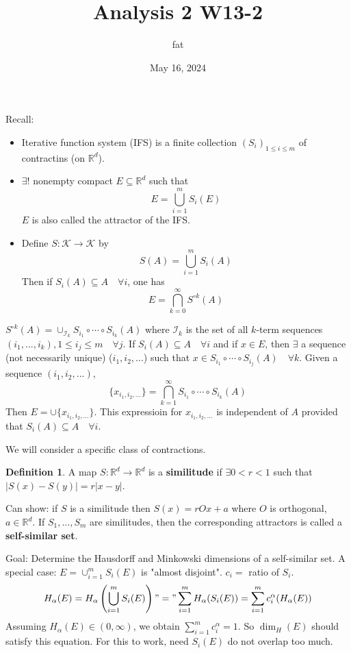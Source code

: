 \documentclass{article}
\title{Analysis 2 W13-2}
\author{fat}
\date{May 16, 2024}
\theoremstyle{definition}
\newtheorem{dfn}{Definition}
\newcommand{\I}{\mathcal I}
\newcommand{\K}{\mathcal K}
\newcommand{\RR}{\mathbb R}
\begin{document}
\maketitle
\thispagestyle{fancy}
\renewcommand{\footrulewidth}{0.4pt}
\cfoot{\thepage}
\renewcommand{\headrulewidth}{0.4pt}

Recall: 
\begin{itemize}
	\item Iterative function system (IFS) is a finite collection $(S_i)_{1 \leq i \leq m}$ of contractins (on $\RR^d$).

	\item $\exists ! $ nonempty compact $E \subseteq \RR^d$ such that
		\[
			E = \bigcup_{i = 1}^m S_i(E)
		\]
		$E$ is also called the attractor of the IFS.

	\item Define $S:\K \to \K$ by 
		\[
			S(A) = \bigcup_{i = 1}^m S_i(A)
		\]
		Then if $S_i(A) \subseteq A \quad \forall i$, one has
		\[
			E = \bigcap_{k = 0}^\infty S^{\circ k}(A)
		\]
\end{itemize}
$S^{\circ k}(A) = \cup_{\I_k} S_{i_1} \circ \cdots \circ S_{i_k}(A)$ where $\I_k$ is the set of all $k$-term sequences $(i_1, ..., i_k), 1 \leq i_j \leq m \quad \forall j$.
If $S_i(A) \subseteq A \quad \forall i$ and if $x \in E$, then $\exists$ a sequence (not necessarily unique) ($i_1, i_2, ...$) such that $x \in S_{i_1} \circ \cdots \circ S_{i_j}(A) \quad \forall k$.
Given a sequence $(i_1, i_2, ...)$, 
\[
	\{x_{i_1, i_2, ...}\} = \bigcap_{k = 1}^\infty S_{i_1} \circ \cdots \circ S_{i_k}(A)
\]
Then $E = \cup\{x_{i_1, i_2, ...}\}$.
This expressioin for $x_{i_1, i_2, ...}$ is independent of $A$ provided that $S_i(A) \subseteq A \quad \forall i$.

\par We will consider a specific class of contractions.

\begin{dfn}
	A map $S: \RR^d \to \RR^d$ is a \textbf{similitude} if $\exists 0 < r < 1$ such that $|S(x) - S(y)| = r |x - y|$.
\end{dfn}

Can show: if $S$ is a similitude then $S(x) = r O x + a$ where $O$ is orthogonal, $a \in \RR^d$.
If $S_1, ..., S_m$ are similitudes, then the corresponding attractors is called a \textbf{self-similar set}.

\par Goal: Determine the Hausdorff and Minkowski dimensions of a self-similar set.
A special case: $E = \cup_{i = 1}^m S_i(E)$ is "almost disjoint".
$c_i =$ ratio of $S_i$.
\[
	H_\alpha(E) = H_\alpha \left( \bigcup_{i = 1}^m S_i(E) \right) "=" \sum_{i = 1}^m H_\alpha(S_i(E)) = \sum_{i = 1}^m c_i^\alpha(H_\alpha(E))
\]
Assuming $H_\alpha(E) \in (0, \infty)$, we obtain $\sum_{i = 1}^m c_i^\alpha = 1$.
So $\dim_H(E)$ should satisfy this equation.
For this to work, need $S_i(E)$ do not overlap too much.
\end{document}
